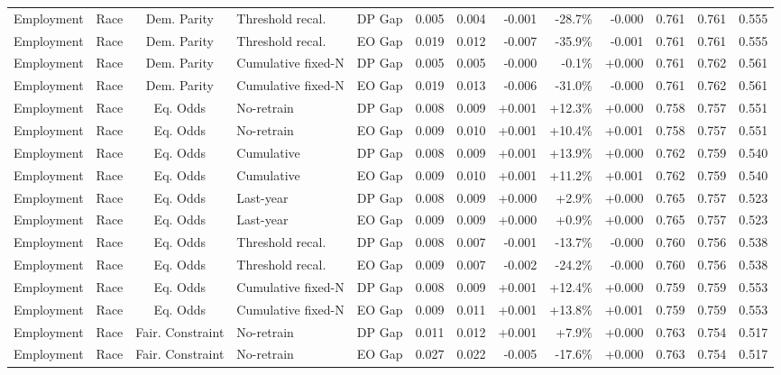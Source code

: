 \begin{longtable}{llcllrrrrrrrr}
Employment & Race & Dem. Parity & Threshold recal. & DP Gap & 0.005 & 0.004 & -0.001 & -28.7\% & -0.000 & 0.761 & 0.761 & 0.555 \\
Employment & Race & Dem. Parity & Threshold recal. & EO Gap & 0.019 & 0.012 & -0.007 & -35.9\% & -0.001 & 0.761 & 0.761 & 0.555 \\
Employment & Race & Dem. Parity & Cumulative fixed-N & DP Gap & 0.005 & 0.005 & -0.000 & -0.1\% & +0.000 & 0.761 & 0.762 & 0.561 \\
Employment & Race & Dem. Parity & Cumulative fixed-N & EO Gap & 0.019 & 0.013 & -0.006 & -31.0\% & -0.000 & 0.761 & 0.762 & 0.561 \\
Employment & Race & Eq. Odds & No-retrain & DP Gap & 0.008 & 0.009 & +0.001 & +12.3\% & +0.000 & 0.758 & 0.757 & 0.551 \\
Employment & Race & Eq. Odds & No-retrain & EO Gap & 0.009 & 0.010 & +0.001 & +10.4\% & +0.001 & 0.758 & 0.757 & 0.551 \\
Employment & Race & Eq. Odds & Cumulative & DP Gap & 0.008 & 0.009 & +0.001 & +13.9\% & +0.000 & 0.762 & 0.759 & 0.540 \\
Employment & Race & Eq. Odds & Cumulative & EO Gap & 0.009 & 0.010 & +0.001 & +11.2\% & +0.001 & 0.762 & 0.759 & 0.540 \\
Employment & Race & Eq. Odds & Last-year & DP Gap & 0.008 & 0.009 & +0.000 & +2.9\% & +0.000 & 0.765 & 0.757 & 0.523 \\
Employment & Race & Eq. Odds & Last-year & EO Gap & 0.009 & 0.009 & +0.000 & +0.9\% & +0.000 & 0.765 & 0.757 & 0.523 \\
Employment & Race & Eq. Odds & Threshold recal. & DP Gap & 0.008 & 0.007 & -0.001 & -13.7\% & -0.000 & 0.760 & 0.756 & 0.538 \\
Employment & Race & Eq. Odds & Threshold recal. & EO Gap & 0.009 & 0.007 & -0.002 & -24.2\% & -0.000 & 0.760 & 0.756 & 0.538 \\
Employment & Race & Eq. Odds & Cumulative fixed-N & DP Gap & 0.008 & 0.009 & +0.001 & +12.4\% & +0.000 & 0.759 & 0.759 & 0.553 \\
Employment & Race & Eq. Odds & Cumulative fixed-N & EO Gap & 0.009 & 0.011 & +0.001 & +13.8\% & +0.001 & 0.759 & 0.759 & 0.553 \\
Employment & Race & Fair. Constraint & No-retrain & DP Gap & 0.011 & 0.012 & +0.001 & +7.9\% & +0.000 & 0.763 & 0.754 & 0.517 \\
Employment & Race & Fair. Constraint & No-retrain & EO Gap & 0.027 & 0.022 & -0.005 & -17.6\% & +0.000 & 0.763 & 0.754 & 0.517 \\

\end{longtable}

